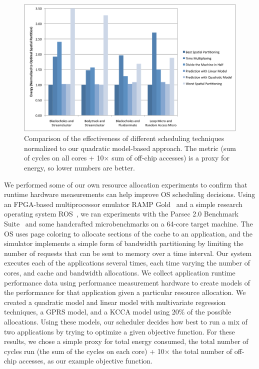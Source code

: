 \begin{figure}[tb]
  \begin{center}
    \includegraphics[width=\linewidth]{Figures/scheduling_results_energy.pdf}
  \end{center}
  \caption{Comparison of the effectiveness of different scheduling
    techniques normalized to our quadratic model-based approach.  The
    metric (sum of cycles on all cores + 10$\times$ sum of off-chip
    accesses) is a proxy for energy, so lower numbers are better.}
  \label{fig:scheduling_results}
\end{figure}


We performed some of our own resource allocation experiments to
confirm that runtime hardware measurements can help improve OS
scheduling decisions.  Using an FPGA-based multiprocessor emulator RAMP Gold~\cite{rampgold09, rampgold10, fame10} and
a simple research operating system ROS~\cite{ros, tess,tess_resource}, we ran experiments with the Parsec
2.0 Benchmark Suite~\cite{parsec} and some handcrafted
microbenchmarks on a 64-core target machine. The OS uses page coloring
to allocate sections of the cache to an application, and the simulator
implements a simple form of bandwidth partitioning by limiting the
number of requests that can be sent to memory over a time
interval. Our system executes each of the applications several times,
each time varying the number of cores, and cache and bandwidth
allocations.  We collect application runtime performance data using
performance measurement hardware to create models of the performance
for that application given a particular resource allocation.  We
created a quadratic model and linear model with multivariate
regression techniques, a GPRS model, and a KCCA model using 20\% of the possible allocations.  Using
these models, our scheduler decides how best to run a mix of two
applications by trying to optimize a given objective function.  For
these results, we chose a simple proxy for total energy consumed, the
total number of cycles run (the sum of the cycles on each core) +
10$\times$ the total number of off-chip accesses, as our example
objective function.

